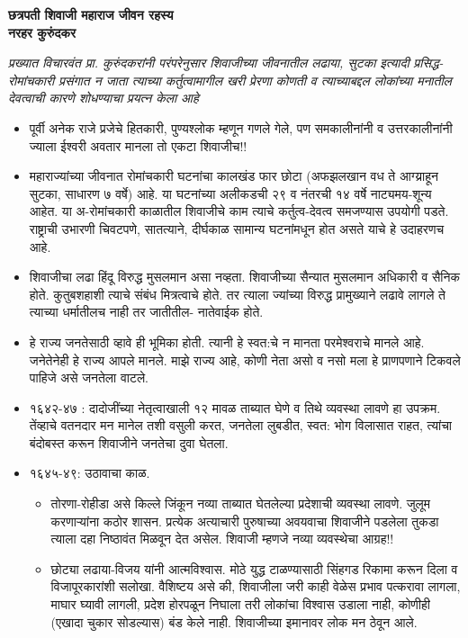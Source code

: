 \begin{center}
     \Large{\textbf{छत्रपती शिवाजी महाराज जीवन रहस्य \\ नरहर कुरुंदकर}}  %
\end{center}

{\em प्रख्यात विचारवंत प्रा. कुरुंदकरांनी परंपरेनुसार शिवाजीच्या जीवनातील लढाया, सुटका इत्यादी प्रसिद्ध-रोमांचकारी प्रसंगात न जाता त्याच्या कर्तुत्वामागील खरी प्रेरणा कोणती व त्याच्याबद्दल लोकांच्या मनातील देवत्वाची कारणे शोधण्याचा प्रयत्न केला आहे}

\bigskip

\begin{itemize}

\item पूर्वी अनेक राजे प्रजेचे हितकारी, पुण्यश्लोक म्हणून गणले गेले, पण समकालीनांनी व उत्तरकालीनांनी ज्याला ईश्वरी अवतार मानला तो एकटा शिवाजीच!!

\item महाराज्यांच्या जीवनात रोमांचकारी घटनांचा कालखंड फार छोटा (अफझलखान वध ते आग्य्राहून सुटका, साधारण ७ वर्षे) आहे. या घटनांच्या अलीकडची २९ व नंतरची १४ वर्षे नाट्यमय-शून्य आहेत. या अ-रोमांचकारी काळातील शिवाजीचे काम त्याचे कर्तुत्व-देवत्व समजण्यास उपयोगी पडते. राष्ट्राची उभारणी चिवटपणे, सातत्याने, दीर्घकाळ सामान्य घटनांमधून होत असते याचे हे उदाहरणच आहे.

\item शिवाजीचा लढा हिंदू विरुद्ध मुसलमान असा नव्हता. शिवाजीच्या सैन्यात मुसलमान अधिकारी व सैनिक होते. कुतुबशहाशी त्याचे संबंध मित्रत्वाचे होते. तर त्याला ज्यांच्या विरुद्ध प्रामुख्याने लढावे लागले ते त्याच्या धर्मातीलच नाही तर जातीतील- नातेवाईक होते. 

\item हे राज्य जनतेसाठी व्हावे ही भूमिका होती. त्यानी हे स्वत:चे न मानता परमेश्वराचे मानले आहे. जनेतेनेही हे राज्य आपले मानले. माझे राज्य आहे, कोणी नेता असो व नसो मला हे प्राणपणाने टिकवले पाहिजे असे जनतेला वाटले.

\item १६४२-४७ : दादोजींच्या नेतृत्वाखाली १२ मावळ ताब्यात घेणे व तिथे व्यवस्था लावणे हा उपक्रम. तेंव्हाचे वतनदार मन मानेल तशी वसुली करत, जनतेला लुबडीत, स्वत: भोग विलासात राहत, त्यांचा बंदोबस्त करून शिवाजीने जनतेचा दुवा घेतला.

\item १६४५-४९: उठावाचा काळ. 
	\begin{itemize}
	\item तोरणा-रोहीडा असे किल्ले जिंकून नव्या ताब्यात घेतलेल्या प्रदेशाची व्यवस्था लावणे. जुलूम करणाऱ्यांना कठोर शासन. प्रत्येक अत्याचारी पुरुषाच्या अवयवाचा शिवाजीने पडलेला तुकडा त्याला दहा निष्ठावंत मिळवून देत असेल. शिवाजी म्हणजे नव्या व्यवस्थेचा आग्रह!! 
	\item छोट्या लढाया-विजय यांनी आत्मविश्वास. मोठे युद्ध टाळण्यासाठी सिंहगड रिकामा करून दिला व विजापूरकारांशी सलोखा. वैशिष्टय असे की, शिवाजीला जरी काही वेळेस प्रभाव पत्करावा लागला, माघार घ्यावी लागली, प्रदेश होरपळून निघाला तरी लोकांचा विश्वास उडाला नाही, कोणीही (एखादा चुकार सोडल्यास) बंड केले नाही. शिवाजीच्या इमानावर लोक मन ठेवून आले.
	\end{itemize}


\end{itemize}
